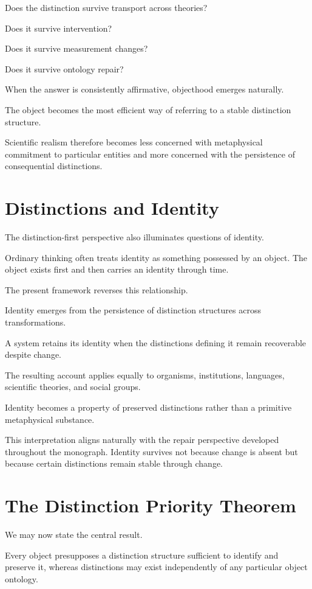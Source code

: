 \documentclass[11pt,oneside,openany]{book}
\begin{document}
Does the distinction survive transport across theories?

Does it survive intervention?

Does it survive measurement changes?

Does it survive ontology repair?

When the answer is consistently affirmative, objecthood emerges naturally.

The object becomes the most efficient way of referring to a stable distinction structure.

Scientific realism therefore becomes less concerned with metaphysical commitment to particular entities and more concerned with the persistence of consequential distinctions.

\section{Distinctions and Identity}

The distinction-first perspective also illuminates questions of identity.

Ordinary thinking often treats identity as something possessed by an object. The object exists first and then carries an identity through time.

The present framework reverses this relationship.

Identity emerges from the persistence of distinction structures across transformations.

A system retains its identity when the distinctions defining it remain recoverable despite change.

The resulting account applies equally to organisms, institutions, languages, scientific theories, and social groups.

Identity becomes a property of preserved distinctions rather than a primitive metaphysical substance.

This interpretation aligns naturally with the repair perspective developed throughout the monograph. Identity survives not because change is absent but because certain distinctions remain stable through change.

\section{The Distinction Priority Theorem}

We may now state the central result.

\begin{theorem}

Every object presupposes a distinction structure sufficient to identify and preserve it, whereas distinctions may exist independently of any particular object ontology.

\end{theorem}
\end{document}

